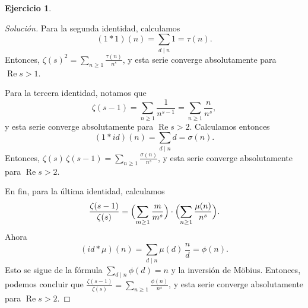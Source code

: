 \documentclass{article}
\newcounter{tarea}
\theoremstyle{definition}
\newtheorem{ejercicio}{Ejercicio}[tarea]
\newenvironment{solucion}{\begin{proof}[Solución]}{\end{proof}}
\renewcommand{\Re}{\operatorname{Re}}
\begin{document}
\begin{ejercicio}
\begin{solucion}
    Para la segunda identidad, calculamos
    $$(1 \ast 1) (n) = \sum_{d\mid n} 1 = \tau (n).$$
    Entonces, $\zeta (s)^2 = \sum_{n\ge 1} \frac{\tau (n)}{n^s}$, y esta serie
    converge absolutamente para ${\Re s > 1}$.

    Para la tercera identidad, notamos que
    $$\zeta (s-1) = \sum_{n\ge 1} \frac{1}{n^{s-1}} = \sum_{n\ge 1} \frac{n}{n^s},$$
    y esta serie converge absolutamente para $\Re s > 2$. Calculamos entonces
    $$(1\ast id) (n)= \sum_{d\mid n} d = \sigma (n).$$
    Entonces, $\zeta (s)\,\zeta (s-1) = \sum_{n\ge 1} \frac{\sigma (n)}{n^s}$,
    y esta serie converge absolutamente para $\Re s > 2$.

    En fin, para la última identidad, calculamos
    \[ \frac{\zeta (s-1)}{\zeta (s)}
    = \Bigl(\sum_{m\ge 1} \frac{m}{m^s}\Bigr)\cdot
    \Bigl(\sum_{n\ge 1} \frac{\mu (n)}{n^s}\Bigr). \]
    Ahora
    $$(id\ast\mu) (n) = \sum_{d\mid n} \mu (d)\,\frac{n}{d} = \phi (n).$$
    Esto se sigue de la fórmula $\sum_{d\mid n} \phi (d) = n$ y la inversión
    de Möbius. Entonces, podemos concluir que
    $\frac{\zeta (s-1)}{\zeta (s)} = \sum_{n\ge 1} \frac{\phi (n)}{n^s}$,
    y esta serie converge absolutamente para $\Re s > 2$.
  \end{solucion}
  \fi
\end{ejercicio}
\end{document}
